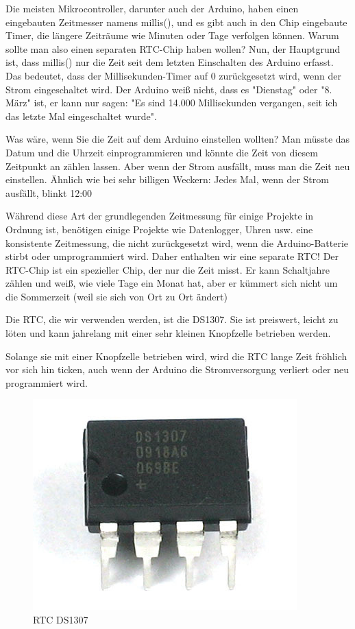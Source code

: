 \documentclass[conference]{IEEEtran}
\begin{document}
Die meisten Mikrocontroller, darunter auch der Arduino, haben einen eingebauten Zeitmesser namens millis(), und es gibt auch in den Chip eingebaute Timer, die längere Zeiträume wie Minuten oder Tage verfolgen können. Warum sollte man also einen separaten RTC-Chip haben wollen? Nun, der Hauptgrund ist, dass millis() nur die Zeit seit dem letzten Einschalten des Arduino erfasst. Das bedeutet, dass der Millisekunden-Timer auf 0 zurückgesetzt wird, wenn der Strom eingeschaltet wird. Der Arduino weiß nicht, dass es "Dienstag" oder "8. März" ist, er kann nur sagen: "Es sind 14.000 Millisekunden vergangen, seit ich das letzte Mal eingeschaltet wurde".

Was wäre, wenn Sie die Zeit auf dem Arduino einstellen wollten? Man müsste das Datum und die Uhrzeit einprogrammieren und könnte die Zeit von diesem Zeitpunkt an zählen lassen. Aber wenn der Strom ausfällt, muss man die Zeit neu einstellen. Ähnlich wie bei sehr billigen Weckern: Jedes Mal, wenn der Strom ausfällt, blinkt 12:00

Während diese Art der grundlegenden Zeitmessung für einige Projekte in Ordnung ist, benötigen einige Projekte wie Datenlogger, Uhren usw. eine konsistente Zeitmessung, die nicht zurückgesetzt wird, wenn die Arduino-Batterie stirbt oder umprogrammiert wird. Daher enthalten wir eine separate RTC! Der RTC-Chip ist ein spezieller Chip, der nur die Zeit misst. Er kann Schaltjahre zählen und weiß, wie viele Tage ein Monat hat, aber er kümmert sich nicht um die Sommerzeit (weil sie sich von Ort zu Ort ändert)

Die RTC, die wir verwenden werden, ist die DS1307. Sie ist preiswert, leicht zu löten und kann jahrelang mit einer sehr kleinen Knopfzelle betrieben werden.

Solange sie mit einer Knopfzelle betrieben wird, wird die RTC lange Zeit fröhlich vor sich hin ticken, auch wenn der Arduino die Stromversorgung verliert oder neu programmiert wird.

\begin{figure}[h]
	\begin{center}
		\includegraphics[scale=0.35]{rtc}
	\end{center}
	\caption{RTC DS1307}
\end{figure}
\end{document}
